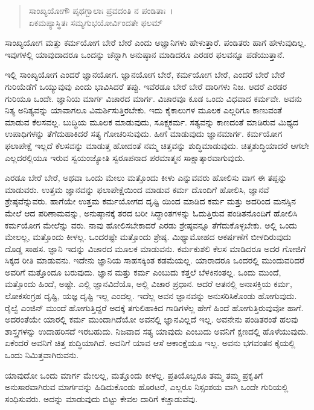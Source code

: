 \begin{verse}
ಸಾಂಖ್ಯಯೋಗೌ ಪೃಥಗ್ಬಾಲಾಃ ಪ್ರವದಂತಿ ನ ಪಂಡಿತಾಃ~।\\ಏಕಮಪ್ಯಾಸ್ಥಿತಃ ಸಮ್ಯಗುಭಯೋರ್ವಿಂದತೇ ಫಲಮ್ 
\end{verse}

{\small ಸಾಂಖ್ಯಯೋಗ ಮತ್ತು ಕರ್ಮಯೋಗ ಬೇರೆ ಬೇರೆ ಎಂದು ಅಜ್ಞಾನಿಗಳು ಹೇಳುತ್ತಾರೆ. ಪಂಡಿತರು ಹಾಗೆ ಹೇಳುವುದಿಲ್ಲ. ಇವುಗಳಲ್ಲಿ ಯಾವುದಾದರೂ ಒಂದನ್ನು ಚೆನ್ನಾಗಿ ಅನುಷ್ಠಾನ ಮಾಡಿದರೂ ಎರಡರ ಫಲವನ್ನೂ ಪಡೆಯುತ್ತಾನೆ.}

ಇಲ್ಲಿ ಸಾಂಖ್ಯಯೋಗ ಎಂದರೆ ಜ್ಞಾನಯೋಗ. ಜ್ಞಾನಯೋಗ ಬೇರೆ, ಕರ್ಮಯೋಗ ಬೇರೆ, ಎಂದರೆ ಬೇರೆ ಬೇರೆ ಗುರಿಯೆಡೆಗೆ ಒಯ್ಯುವುವು ಎಂದು ಭಾವಿಸಿದರೆ ತಪ್ಪು. ಇವೆರಡೂ ಬೇರೆ ಬೇರೆ ದಾರಿಗಳು ನಿಜ. ಆದರೆ ಎರಡರ ಗುರಿಯೂ ಒಂದೇ. ಜ್ಞಾನಿಯ ಮಾರ್ಗ ವಿಚಾರದ ಮಾರ್ಗ. ವಿಚಾರವೂ ಕೂಡ ಒಂದು ವಿಧವಾದ ಕರ್ಮವೇ. ಅವನು ನಿತ್ಯ ಅನಿತ್ಯವನ್ನು ಯಾವಾಗಲೂ ವಿಮರ್ಶಿಸುತ್ತಿರಬೇಕು. ಇದು ಕೈಕಾಲುಗಳ ಮೂಲಕ ಎಲ್ಲರಿಗೂ ಕಾಣುವಂತೆ ಮಾಡುವ ಕೆಲಸವಲ್ಲ. ಬುದ್ಧಿಯ ಮೂಲಕ ಮಾಡುವುದು, ಸೂಕ್ಷ್ಮಕರ್ಮ. ಸತ್ಯವನ್ನು ಕಾಣದಂತೆ ಮಾಡಿರುವ ಮಿಥ್ಯದ ಉಪಾಧಿಗಳನ್ನು ತೆಗೆದುಹಾಕಿದರೆ ಸತ್ಯ ಗೋಚರಿಸುವುದು. ಹೀಗೆ ಮಾಡುವುದು ಜ್ಞಾನಮಾರ್ಗ. ಕರ್ಮಯೋಗ ಫಲಾಪೇಕ್ಷೆ ಇಲ್ಲದೆ ಕೆಲಸವನ್ನು ಮಾಡುತ್ತ ಹೋದಂತೆ ನಮ್ಮ ಚಿತ್ತವನ್ನು ಶುದ್ಧಿಮಾಡುವುದು. ಚಿತ್ತಶುದ್ಧಿಯಾದರೆ ಆಗಲೇ ಎಲ್ಲದರಲ್ಲಿಯೂ ಇರುವ ಸ್ವಯಂಜ್ಯೋತಿ ಸ್ವರೂಪನಾದ ಪರಮಾತ್ಮನ ಸಾಕ್ಷಾತ್ಕಾರವಾಗುವುದು.

ಎರಡೂ ಬೇರೆ ಬೇರೆ, ಅಥವಾ ಒಂದು ಮೇಲು ಮತ್ತೊಂದು ಕೀಳು ಎನ್ನುವವರು ಹೋಲಿಸು ವಾಗ ಈ ತಪ್ಪನ್ನು ಮಾಡುವರು. ಉತ್ತಮ ಜ್ಞಾನವನ್ನು ಫಲಾಪೇಕ್ಷೆಯಿಂದ ಮಾಡುವ ಕರ್ಮ ದೊಂದಿಗೆ ಹೋಲಿಸಿ, ಜ್ಞಾನವೆ ಶ್ರೇಷ್ಠವೆನ್ನುವರು. ಹಾಗೆಯೇ ಉತ್ತಮ ಕರ್ಮಯೋಗದ ದೃಷ್ಟಿ ಯಿಂದ ಮಾಡಿದ ಕರ್ಮ ಮತ್ತು ಅದರಿಂದ ಮನಸ್ಸಿನ ಮೇಲೆ ಆದ ಪರಿಣಾಮವನ್ನು, ಅನುಷ್ಠಾನಕ್ಕೆ ತರದ ಬರೀ ಸಿದ್ಧಾಂತಗಳನ್ನು ಓದುತ್ತಿರುವ ಪಂಡಿತನೊಂದಿಗೆ ಹೋಲಿಸಿ ಕರ್ಮಯೋಗ ಮೇಲೆನ್ನು ವರು. ನಾವು ಹೋಲಿಸಬೇಕಾದರೆ ಎರಡು ಶ್ರೇಷ್ಠವನ್ನೂ ತೆಗೆದುಕೊಳ್ಳಬೇಕು. ಅಲ್ಲಿ ಒಂದು ಮೇಲಲ್ಲ, ಮತ್ತೊಂದು ಕೀಳಲ್ಲ. ಒಂದರಷ್ಟೇ ಮತ್ತೊಂದು ಶ್ರೇಷ್ಠ. ಮಿಥ್ಯಾಮೋಹದ ಆಕರ್ಷಣೆಗೆ ಬೀಳದಿರುವುದು ದೊಡ್ಡ ಸಾಹಸ. ಜ್ಞಾನಿ ಇದನ್ನು ವಿಚಾರದ ಮೂಲಕ ಮಾಡುವನು. ಕರ್ಮಕುಶಲಿ ಕೆಲಸ ಮಾಡಿದರೂ ಅದರ ಗೋಜಿಗೆ ಸಿಕ್ಕದ ರೀತಿ ಮಾಡುವನು. ಇದೇನು ಜ್ಞಾನಿಯ ಸಾಹಸಕ್ಕಿಂತ ಕಡಮೆಯಲ್ಲ. ಯಾರಾದರೂ ಒಂದರಲ್ಲಿ ಮುಂದುವರಿದರೆ ಅವರಿಗೆ ಮತ್ತೊಂದೂ ಬರುವುದು. ಜ್ಞಾನ ಮತ್ತು ಕರ್ಮ ಎಂಬುದು ಕತ್ತಲೆ ಬೆಳಕಿನಂತಲ್ಲ. ಒಂದು ಮುಂದೆ, ಮತ್ತೊಂದು ಹಿಂದೆ, ಅಷ್ಟೇ. ಎಲ್ಲಿ ಜ್ಞಾನವಿದೆಯೊ, ಅಲ್ಲಿ ವಿಚಾರ ಪ್ರಧಾನ. ಆದರೆ ಆತನಲ್ಲಿ ಅನಾಸಕ್ತಿಯ ಕರ್ಮ, ಲೋಕಸಂಗ್ರಹ ದೃಷ್ಟಿ, ಯಜ್ಞ ದೃಷ್ಟಿ ಇಲ್ಲ ಎಂದಲ್ಲ. ಇದೆಲ್ಲ ಅವನ ಜ್ಞಾನವನ್ನು ಅನುಸರಿಸಿಕೊಂಡು ಹೋಗುವುದು. ರೈಲ್ವೆ ಎಂಜಿನ್ ಮುಂದೆ ಹೋಗುತ್ತಿದ್ದರೆ ಅದಕ್ಕೆ ತಗುಲಿಹಾಕಿದ ಗಾಡಿಗಳೆಲ್ಲ ಹೇಗೆ ಹಿಂದೆ ಹೋಗುತ್ತಿರುವುವೋ ಹಾಗೆ. ಅದರಂತೆಯೇ ಯಾರಲ್ಲಿ ಕರ್ಮ ಮುಂದಾಗಿದೆಯೋ ಅವನಲ್ಲಿ ಜ್ಞಾನವಿಲ್ಲದೆ ಇಲ್ಲ. ಅವನೇನು ಪಂಡಿತರಂತೆ ಹಲವು ಶಾಸ್ತ್ರಗಳನ್ನು ಉದಾಹರಿಸದೆ ಇರಬಹುದು. ನಿಜವಾದ ಸತ್ಯ ಯಾವುದು ಎಂಬುದು ಅವನಿಗೆ ಕ್ಷಣದಲ್ಲಿ ಹೊಳೆಯುವುದು. ಏಕೆಂದರೆ ಅವನಿಗೆ ಚಿತ್ತ ಶುದ್ಧಿಯಾಗಿದೆ. ಅವನಿಗೆ ಯಾವ ಆಸೆ ಆಕಾಂಕ್ಷೆಯೂ ಇಲ್ಲ. ಅವನು ಭಗವಂತನ ಕೈಯಲ್ಲಿ ಒಂದು ನಿಮಿತ್ತವಾಗಿರುವನು.

ಯಾವುದೋ ಒಂದು ಮಾರ್ಗ ಮೇಲಲ್ಲ, ಮತ್ತೊಂದು ಕೀಳಲ್ಲ. ಪ್ರತಿಯೊಬ್ಬರೂ ತಮ್ಮ ತಮ್ಮ ಪ್ರಕೃತಿಗೆ ಅನುಸಾರವಾಗಿರುವ ಮಾರ್ಗವನ್ನು ಹಿಡಿದುಕೊಂಡು ಹೊರಟರೆ, ಎಲ್ಲರೂ ನಿಸ್ಸಂಶಯ ವಾಗಿ ಒಂದೇ ಗುರಿಯಲ್ಲಿ ಸಂಧಿಸುವರು. ಅದನ್ನು ಮಾಡುವುದು ಬಿಟ್ಟು ಕೇವಲ ದಾರಿಗೆ ಕಚ್ಚಾಡುವೆವು.

